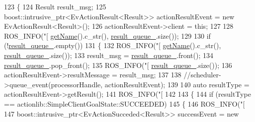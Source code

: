 \begin{DoxyCode}
123     \{
124         Result result\_msg;
125         boost::intrusive\_ptr<EvActionResult<Result>> actionResultEvent = \textcolor{keyword}{new} EvActionResult<Result>();
126         actionResultEvent->client = \textcolor{keyword}{this};
127 
128         ROS\_INFO(\textcolor{stringliteral}{"[%
      \hyperlink{classsmacc_1_1ISmaccClient_a20846aabfd1de832aa27d7a8237a1742}{getName}().c\_str(), \hyperlink{classsmacc_1_1SmaccActionClientBase_a42c2e070235e6eeaca970c2abaeabec4}{result\_queue\_}.size());
129 
130         \textcolor{keywordflow}{if} (!\hyperlink{classsmacc_1_1SmaccActionClientBase_a42c2e070235e6eeaca970c2abaeabec4}{result\_queue\_}.empty())
131         \{
132             ROS\_INFO(\textcolor{stringliteral}{"[%
      \hyperlink{classsmacc_1_1ISmaccClient_a20846aabfd1de832aa27d7a8237a1742}{getName}().c\_str(), \hyperlink{classsmacc_1_1SmaccActionClientBase_a42c2e070235e6eeaca970c2abaeabec4}{result\_queue\_}.size());
133             result\_msg = \hyperlink{classsmacc_1_1SmaccActionClientBase_a42c2e070235e6eeaca970c2abaeabec4}{result\_queue\_}.front();
134             \hyperlink{classsmacc_1_1SmaccActionClientBase_a42c2e070235e6eeaca970c2abaeabec4}{result\_queue\_}.pop\_front();
135             ROS\_INFO(\textcolor{stringliteral}{"[%
      \hyperlink{classsmacc_1_1SmaccActionClientBase_a42c2e070235e6eeaca970c2abaeabec4}{result\_queue\_}.size());
136             actionResultEvent->resultMessage = result\_msg;
137 
138             \textcolor{comment}{//scheduler->queue\_event(processorHandle, actionResultEvent);}
139 
140             \textcolor{keyword}{auto} resultType = actionResultEvent->getResult();
141             ROS\_INFO(\textcolor{stringliteral}{"[%
142 
143             \{
144                 \textcolor{keywordflow}{if} (resultType == actionlib::SimpleClientGoalState::SUCCEEDED)
145                 \{
146                     ROS\_INFO(\textcolor{stringliteral}{"[%
147                     boost::intrusive\_ptr<EvActionSucceded<Result>> successEvent = \textcolor{keyword}{new} 
}}}}}
\end{DoxyCode}
